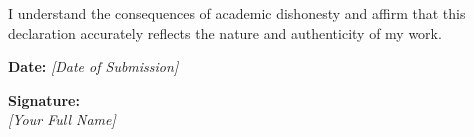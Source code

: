 I understand the consequences of academic dishonesty and affirm that this declaration accurately reflects the nature and authenticity of my work.
\begin{flushright}
	\textbf{Date:} \textit{[Date of Submission]}
\end{flushright}
\begin{flushright}
	\textbf{Signature:} \underline{\hspace{5cm}} \\
	\textit{[Your Full Name]}
\end{flushright}